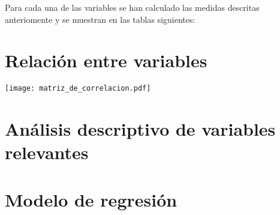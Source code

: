 \documentclass{article}
\begin{document}
Para cada una de las variables se han calculado las medidas descritas anteriomente y se muestran en las tablas siguientes:




\section{Relación entre variables}

\texttt{[image: matriz\_de\_correlacion.pdf]}

\section{Análisis descriptivo de variables relevantes}

\section{Modelo de regresión}
\end{document}

